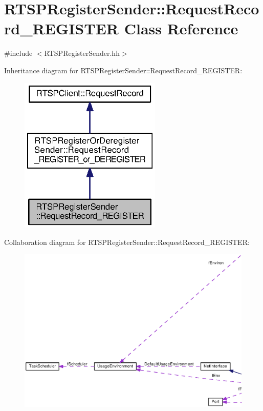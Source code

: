 \section{R\+T\+S\+P\+Register\+Sender\+:\+:Request\+Record\+\_\+\+R\+E\+G\+I\+S\+T\+E\+R Class Reference}
\label{classRTSPRegisterSender_1_1RequestRecord__REGISTER}


{\ttfamily \#include $<$R\+T\+S\+P\+Register\+Sender.\+hh$>$}



Inheritance diagram for R\+T\+S\+P\+Register\+Sender\+:\+:Request\+Record\+\_\+\+R\+E\+G\+I\+S\+T\+E\+R\+:
\nopagebreak
\begin{figure}[H]
\begin{center}
\leavevmode
\includegraphics[width=191pt]{classRTSPRegisterSender_1_1RequestRecord__REGISTER__inherit__graph}
\end{center}
\end{figure}


Collaboration diagram for R\+T\+S\+P\+Register\+Sender\+:\+:Request\+Record\+\_\+\+R\+E\+G\+I\+S\+T\+E\+R\+:
\nopagebreak
\begin{figure}[H]
\begin{center}
\leavevmode
\includegraphics[width=350pt]{classRTSPRegisterSender_1_1RequestRecord__REGISTER__coll__graph}
\end{center}
\end{figure}
